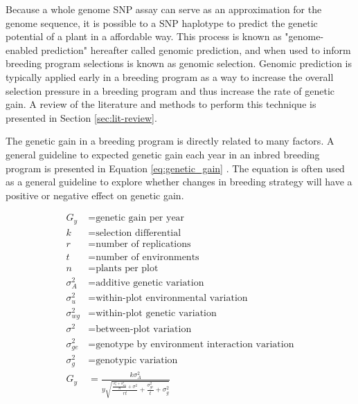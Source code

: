 Because a whole genome SNP assay can serve as an approximation for the genome sequence, 
it is possible to a SNP haplotype to predict the genetic
potential of a plant in a affordable way. This process is known 
as "genome-enabled prediction" hereafter called genomic prediction, and when used to inform breeding 
program selections is known as genomic selection. Genomic prediction is typically 
applied early in a breeding program as a way to increase the overall selection 
pressure in a breeding program and thus increase the rate of genetic gain. A review of the 
literature and methods to perform this technique is presented in Section \ref{sec:lit-review}. 

The genetic gain in a breeding program is directly related to many factors. A 
general guideline to expected genetic gain each year in an inbred breeding 
program is presented in Equation \ref{eq:genetic_gain} \citep{fehr1987}. The equation is
often used as a general guideline to explore whether changes in breeding strategy will
have a positive or negative effect on genetic gain. 

\begin{equation} \label{eq:genetic_gain}
\begin{split}
    G_y           &= \textrm{genetic gain per year} \\
    k             &= \textrm{selection differential} \\
    r             &= \textrm{number of replications} \\
    t             &= \textrm{number of environments} \\
    n             &= \textrm{plants per plot} \\
    \sigma^2_{A}  &= \textrm{additive genetic variation} \\
    \sigma^2_{u}  &= \textrm{within-plot environmental variation} \\
    \sigma^2_{wg} &= \textrm{within-plot genetic variation} \\
    \sigma^2      &= \textrm{between-plot variation} \\
    \sigma^2_{ge} &= \textrm{genotype by environment interaction variation} \\
    \sigma^2_{g}  &= \textrm{genotypic variation} \\
    G_y           &= \frac{k\sigma^2_A}{y \sqrt{ \frac{\frac{\sigma^2_{u} + \sigma^2_{wg}}{n} + \sigma^2}{rt} + \frac{\sigma^2_{ge}}{t} + \sigma^2_{g} }} \\
\end{split}
\end{equation}


